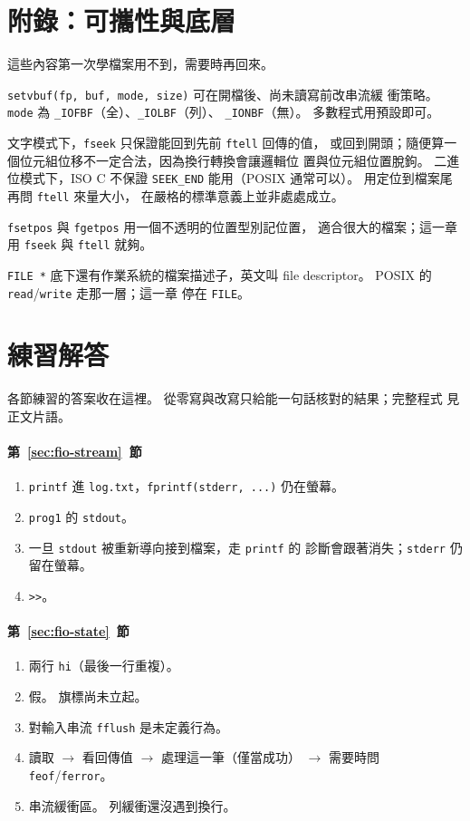 {}
\section*{附錄：可攜性與底層}
\label{sec:fio-advanced}

這些內容第一次學檔案用不到，需要時再回來。

\texttt{setvbuf(fp, buf, mode, size)} 可在開檔後、尚未讀寫前改串流緩
衝策略。 \texttt{mode} 為 \texttt{\_IOFBF}（全）、\texttt{\_IOLBF}（列）、
\texttt{\_IONBF}（無）。 多數程式用預設即可。

文字模式下，\texttt{fseek} 只保證能回到先前 \texttt{ftell} 回傳的值，
或回到開頭；隨便算一個位元組位移不一定合法，因為換行轉換會讓邏輯位
置與位元組位置脫鉤。 二進位模式下，ISO C 不保證 \texttt{SEEK\_END}
能用（POSIX 通常可以）。 用定位到檔案尾再問 \texttt{ftell} 來量大小，
在嚴格的標準意義上並非處處成立。

\texttt{fsetpos} 與 \texttt{fgetpos} 用一個不透明的位置型別記位置，
適合很大的檔案；這一章用 \texttt{fseek} 與 \texttt{ftell} 就夠。

\texttt{FILE *} 底下還有作業系統的檔案描述子，英文叫 file
descriptor。 POSIX 的 \texttt{read}/\texttt{write} 走那一層；這一章
停在 \texttt{FILE}。

{}
\section*{練習解答}

各節練習的答案收在這裡。 從零寫與改寫只給能一句話核對的結果；完整程式
見正文片語。

\paragraph{第~\ref{sec:fio-stream}~節}
\begin{enumerate}
\item \texttt{printf} 進 \texttt{log.txt}，\texttt{fprintf(stderr,
...)} 仍在螢幕。
\item \texttt{prog1} 的 \texttt{stdout}。
\item 一旦 \texttt{stdout} 被重新導向接到檔案，走 \texttt{printf} 的
診斷會跟著消失；\texttt{stderr} 仍留在螢幕。
\item \texttt{>>}。
\end{enumerate}

\paragraph{第~\ref{sec:fio-state}~節}
\begin{enumerate}
\item 兩行 \texttt{hi}（最後一行重複）。
\item 假。 旗標尚未立起。
\item 對輸入串流 \texttt{fflush} 是未定義行為。
\item 讀取 $\rightarrow$ 看回傳值 $\rightarrow$ 處理這一筆（僅當成功）
$\rightarrow$ 需要時問 \texttt{feof}/\texttt{ferror}。
\item 串流緩衝區。 列緩衝還沒遇到換行。
\end{enumerate}

